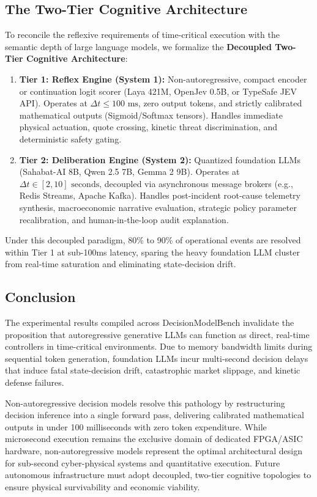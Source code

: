 \documentclass[journal,compsoc]{IEEEtran}
\begin{document}
\subsection{The Two-Tier Cognitive Architecture}
To reconcile the reflexive requirements of time-critical execution with the semantic depth of large language models, we formalize the \textbf{Decoupled Two-Tier Cognitive Architecture}:
\begin{enumerate}
    \item \textbf{Tier 1: Reflex Engine (System 1):} Non-autoregressive, compact encoder or continuation logit scorer (Laya 421M, OpenJev 0.5B, or TypeSafe JEV API). Operates at $\Delta t \le 100 \text{ ms}$, zero output tokens, and strictly calibrated mathematical outputs (Sigmoid/Softmax tensors). Handles immediate physical actuation, quote crossing, kinetic threat discrimination, and deterministic safety gating.
    \item \textbf{Tier 2: Deliberation Engine (System 2):} Quantized foundation LLMs (Sahabat-AI 8B, Qwen 2.5 7B, Gemma 2 9B). Operates at $\Delta t \in [2, 10] \text{ seconds}$, decoupled via asynchronous message brokers (e.g., Redis Streams, Apache Kafka). Handles post-incident root-cause telemetry synthesis, macroeconomic narrative evaluation, strategic policy parameter recalibration, and human-in-the-loop audit explanation.
\end{enumerate}
Under this decoupled paradigm, 80\% to 90\% of operational events are resolved within Tier 1 at sub-100ms latency, sparing the heavy foundation LLM cluster from real-time saturation and eliminating state-decision drift.

\subsection{Conclusion}
The experimental results compiled across DecisionModelBench invalidate the proposition that autoregressive generative LLMs can function as direct, real-time controllers in time-critical environments. Due to memory bandwidth limits during sequential token generation, foundation LLMs incur multi-second decision delays that induce fatal state-decision drift, catastrophic market slippage, and kinetic defense failures.

Non-autoregressive decision models resolve this pathology by restructuring decision inference into a single forward pass, delivering calibrated mathematical outputs in under 100 milliseconds with zero token expenditure. While microsecond execution remains the exclusive domain of dedicated FPGA/ASIC hardware, non-autoregressive models represent the optimal architectural design for sub-second cyber-physical systems and quantitative execution. Future autonomous infrastructure must adopt decoupled, two-tier cognitive topologies to ensure physical survivability and economic viability.
\end{document}
